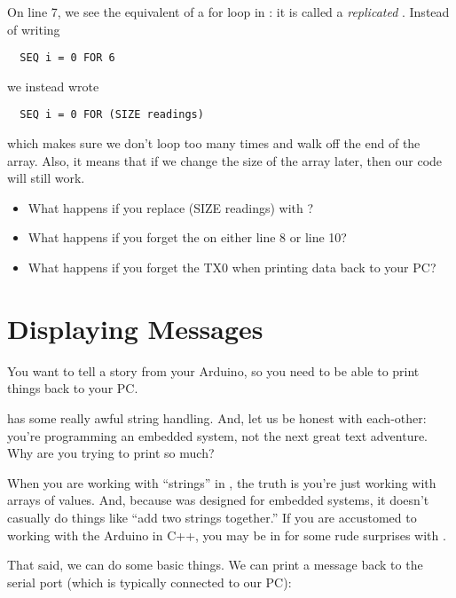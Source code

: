 On line 7, we see the equivalent of a {\code for} loop in \occam: it is called a \emph{replicated \SEQ}. Instead of writing 

\begin{lstlisting}
  SEQ i = 0 FOR 6
\end{lstlisting}

we instead wrote 

\begin{lstlisting}
  SEQ i = 0 FOR (SIZE readings)
\end{lstlisting}

which makes sure we don't loop too many times and walk off the end of the array. Also, it means that if we change the size of the array later, then our code will still work.

\makingthingsbreak
\begin{itemize}
	\item What happens if you replace {\code (SIZE readings}) with {}?
	\item What happens if you forget the {\code [i]} on either line 8 or line 10?
	\item What happens if you forget the {\code TX0} when printing data back to your PC?
\end{itemize}

\seealso

\XXX


% 
\section{Displaying Messages}
\problem
You want to tell a story from your Arduino, so you need to be able to print things back to your PC.

\solution
\occam has some really awful string handling. And, let us be honest with each-other: you're programming an embedded system, not the next great text adventure. Why are you trying to print so much?

When you are working with ``strings'' in \occam, the truth is you're just working with arrays of \BYTE values. And, because \occam was designed for embedded systems, it doesn't casually do things like ``add two strings together.'' If you are accustomed to working with the Arduino in C++, you may be in for some rude surprises with \occam. 

That said, we can do some basic things. We can print a message back to the serial port (which is typically connected to our PC):

